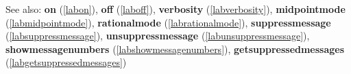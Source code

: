 See also: \textbf{on} (\ref{labon}), \textbf{off} (\ref{laboff}), \textbf{verbosity} (\ref{labverbosity}), \textbf{midpointmode} (\ref{labmidpointmode}), \textbf{rationalmode} (\ref{labrationalmode}), \textbf{suppressmessage} (\ref{labsuppressmessage}), \textbf{unsuppressmessage} (\ref{labunsuppressmessage}), \textbf{showmessagenumbers} (\ref{labshowmessagenumbers}), \textbf{getsuppressedmessages} (\ref{labgetsuppressedmessages})
